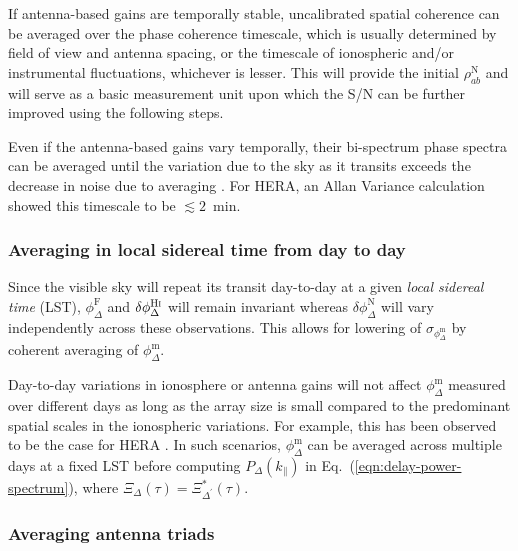 \documentclass[
reprint,
superscriptaddress,
amsmath,
amssymb,
aps,
prd
]{revtex4-1}
\begin{document}
If antenna-based gains are temporally stable, uncalibrated spatial coherence can be averaged over the phase coherence timescale, which is usually determined by field of view and antenna spacing, or the timescale of ionospheric and/or instrumental fluctuations, whichever is lesser. %
This will provide the initial $\rho_{ab}^\textrm{N}$ and will serve as a basic measurement unit upon which the S/N can be further improved using the following steps. 

Even if the antenna-based gains vary temporally, their bi-spectrum phase spectra can be averaged until the variation due to the sky as it transits exceeds the decrease in noise due to averaging \cite{car18}. For HERA, an Allan Variance calculation showed this timescale to be $\lesssim 2$~min. 

\subsubsection{Averaging in local sidereal time from day to day}\label{sec:lst-avg}

Since the visible sky will repeat its transit day-to-day at a given {\it local sidereal time} (LST), $\phi_\Delta^\textrm{F}$ and $\delta\phi_\Delta^\textrm{H{\sc i}}$ will remain invariant whereas $\delta\phi_\Delta^\textrm{N}$ will vary independently across these observations. This allows for lowering of $\sigma_{\phi_\Delta^\textrm{m}}$ by coherent averaging of $\phi_\Delta^\textrm{m}$.

Day-to-day variations in ionosphere or antenna gains will not affect $\phi_\Delta^\textrm{m}$ measured over different days as long as the array size is small compared to the predominant spatial scales in the ionospheric variations. For example, this has been observed to be the case for HERA \cite{car18}. In such scenarios, $\phi_\Delta^\textrm{m}$ can be averaged across multiple days at a fixed LST before computing $P_\Delta(k_\parallel)$ in Eq.~(\ref{eqn:delay-power-spectrum}), where $\Xi_\Delta(\tau)=\Xi_{\Delta^\prime}^*(\tau)$. 

\subsubsection{Averaging antenna triads}\label{sec:triad-avg}
\end{document}
